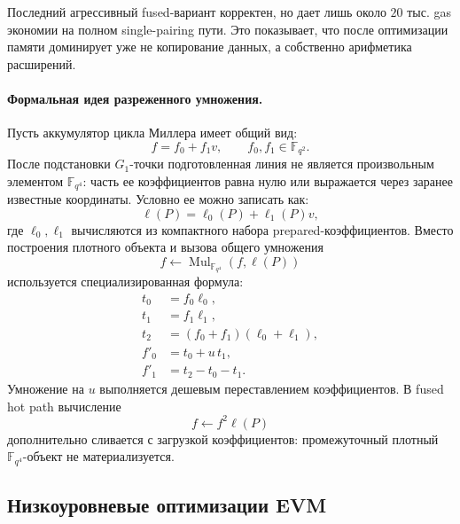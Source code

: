 \documentclass[12pt,a4paper]{article}
\begin{document}
Последний агрессивный fused-вариант корректен, но дает лишь около $20$ тыс.
gas экономии на полном single-pairing пути. Это показывает, что после
оптимизации памяти доминирует уже не копирование данных, а собственно
арифметика расширений.

\paragraph{Формальная идея разреженного умножения.}
Пусть аккумулятор цикла Миллера имеет общий вид:
\[
    f=f_0+f_1v,\qquad f_0,f_1\in\mathbb{F}_{q^2}.
\]
После подстановки $G_1$-точки подготовленная линия не является произвольным
элементом $\mathbb{F}_{q^4}$: часть ее коэффициентов равна нулю или выражается
через заранее известные координаты. Условно ее можно записать как:
\[
    \ell(P)=\ell_0(P)+\ell_1(P)v,
\]
где $\ell_0,\ell_1$ вычисляются из компактного набора prepared-коэффициентов.
Вместо построения плотного объекта и вызова общего умножения
\[
    f\leftarrow\operatorname{Mul}_{\mathbb{F}_{q^4}}(f,\ell(P))
\]
используется специализированная формула:
\[
\begin{aligned}
    t_0&=f_0\ell_0,\\
    t_1&=f_1\ell_1,\\
    t_2&=(f_0+f_1)(\ell_0+\ell_1),\\
    f'_0&=t_0+u\,t_1,\\
    f'_1&=t_2-t_0-t_1.
\end{aligned}
\]
Умножение на $u$ выполняется дешевым переставлением коэффициентов. В fused
hot path вычисление
\[
    f\leftarrow f^2\ell(P)
\]
дополнительно сливается с загрузкой коэффициентов: промежуточный плотный
$\mathbb{F}_{q^4}$-объект не материализуется.

\subsection{Низкоуровневые оптимизации EVM}
\end{document}
